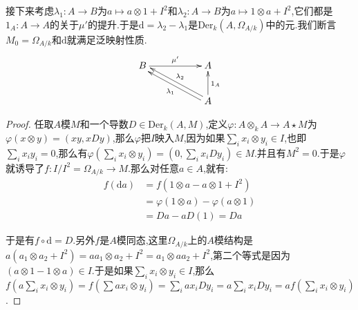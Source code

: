 \begin{enumerate}
	接下来考虑$\lambda_1:A\to B$为$a\mapsto a\otimes 1+I^2$和$\lambda_2:A\to B$为$a\mapsto 1\otimes a+I^2$,它们都是$1_A:A\to A$的关于$\mu'$的提升.于是$\mathrm{d}=\lambda_2-\lambda_1$是$\mathrm{Der}_k(A,\Omega_{A/k})$中的元.我们断言$M_0=\Omega_{A/k}$和$\mathrm{d}$就满足泛映射性质.
	$$\xymatrix{B\ar[rr]^{\mu'}&&A\\&&A\ar[u]_{1_A}\ar@<0.5ex>[ull]^{\lambda_1}\ar@<-0.5ex>[ull]_{\lambda_2}}$$
	\begin{proof}
		
		任取$A$模$M$和一个导数$D\in\mathrm{Der}_k(A,M)$,定义$\varphi:A\otimes_kA\to A\star M$为$\varphi(x\otimes y)=(xy,xDy)$,那么$\varphi$把$I$映入$M$,因为如果$\sum_ix_i\otimes y_i\in I$,也即$\sum_ix_iy_i=0$,那么有$\varphi(\sum_ix_i\otimes y_i)=(0,\sum_ix_iDy_i)\in M$.并且有$M^2=0$.于是$\varphi$就诱导了$f:I/I^2=\Omega_{A/k}\to M$.那么对任意$a\in A$,就有:
		\begin{align*}
			f(\mathrm{d}a)&=f(1\otimes a-a\otimes1+I^2)\\&=\varphi(1\otimes a)-\varphi(a\otimes1)\\&=Da-aD(1)=Da
		\end{align*}
		
		于是有$f\circ\mathrm{d}=D$.另外$f$是$A$模同态,这里$\Omega_{A/k}$上的$A$模结构是$a(a_1\otimes a_2+I^2)=aa_1\otimes a_2+I^2=a_1\otimes aa_2+I^2$,第二个等式是因为$(a\otimes1-1\otimes a)\in I$.于是如果$\sum_ix_i\otimes y_i\in I$,那么$f(a\sum_ix_i\otimes y_i)=f(\sum ax_i\otimes y_i)=\sum_iax_iDy_i=a\sum_ix_iDy_i=af(\sum_ix_i\otimes y_i)$.
		
		\qquad
		

\end{proof}
\end{enumerate}
